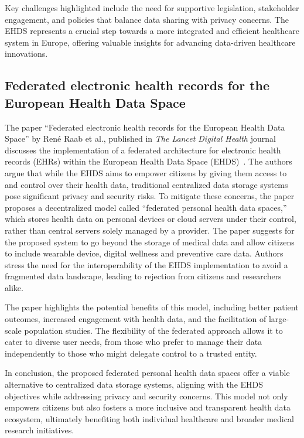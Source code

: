 Key challenges highlighted include the need for supportive legislation, stakeholder engagement, and policies that balance data sharing with privacy concerns.
The EHDS represents a crucial step towards a more integrated and efficient healthcare system in Europe, offering valuable insights for advancing data-driven healthcare innovations.

\subsection{Federated electronic health records for the European Health Data Space}\label{subsec:federated-electronic-health-records-for-the-european-health-data-space}

The paper ``Federated electronic health records for the European Health Data Space'' by René Raab et al., published in \textit{The Lancet Digital Health} journal discusses the implementation of a federated architecture for electronic health records (EHRs) within the European Health Data Space (EHDS)~\cite{raab_federated_2023}.
The authors argue that while the EHDS aims to empower citizens by giving them access to and control over their health data, traditional centralized data storage systems pose significant privacy and security risks.
To mitigate these concerns, the paper proposes a decentralized model called ``federated personal health data spaces,'' which stores health data on personal devices or cloud servers under their control, rather than central servers solely managed by a provider.
The paper suggests for the proposed system to go beyond the storage of medical data and allow citizens to include wearable device, digital wellness and preventive care data.
Authors stress the need for the interoperability of the EHDS implementation to avoid a fragmented data landscape, leading to rejection from citizens and researchers alike.

The paper highlights the potential benefits of this model, including better patient outcomes, increased engagement with health data, and the facilitation of large-scale population studies.
The flexibility of the federated approach allows it to cater to diverse user needs, from those who prefer to manage their data independently to those who might delegate control to a trusted entity.

In conclusion, the proposed federated personal health data spaces offer a viable alternative to centralized data storage systems, aligning with the EHDS objectives while addressing privacy and security concerns.
This model not only empowers citizens but also fosters a more inclusive and transparent health data ecosystem, ultimately benefiting both individual healthcare and broader medical research initiatives.


